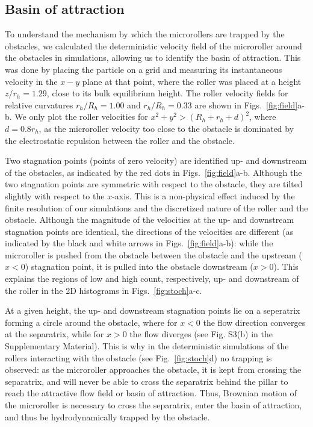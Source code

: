 \documentclass[12pt]{article}
\begin{document}
  



\subsection*{Basin of attraction }

To understand the mechanism by which the microrollers are trapped by the obstacles, we calculated the deterministic velocity field of the microroller around the obstacles in simulations, allowing us to identify the basin of attraction. This was done by placing the particle on a grid and measuring its instantaneous velocity in the $x-y$ plane at that point, where the roller was placed at a height  $z/r_h = 1.29$, close to its bulk equilibrium height.
The roller velocity fields for relative curvatures $r_h/R_h=1.00$ and $r_h/R_h=0.33$ are shown in Figs.~\ref{fig:field}a-b. 
We only plot the roller velocities for $x^2+y^2>(R_h+r_h+d)^2$, where $d=0.8r_h$\cite{electro}, as the microroller velocity too close to the obstacle is dominated by the electrostatic repulsion between the roller and the obstacle.


Two stagnation points (points of zero velocity) are identified up- and downstream of the obstacles, as indicated by the red dots in Figs.~\ref{fig:field}a-b. Although the two stagnation points are symmetric with respect to the obstacle, they are tilted slightly with respect to the $x$-axis. This is a non-physical effect induced by the finite resolution of our simulations and the discretized nature of the roller and the obstacle. Although the magnitude of the velocities at the up- and downstream stagnation points are identical, the directions of the velocities are different (as indicated by the black and white arrows in Figs.~\ref{fig:field}a-b): 
while the microroller is pushed from the obstacle between the obstacle and the upstream ($x<0$) stagnation point, it is pulled into the obstacle downstream ($x>0$).
This explains the regions of low and high count, respectively, up- and downstream of the roller in the 2D histograms in Figs.~\ref{fig:stoch}a-c.

At a given height, the up- and downstream stagnation points lie on a seperatrix forming a circle around the obstacle, where for $x<0$ the flow direction converges at the separatrix, while for $x>0$ the flow diverges (see Fig. S3(b) in the Supplementary Material). This is why in the deterministic simulations of the rollers interacting with the obstacle (see Fig.~\ref{fig:stoch}d) no trapping is observed: as the microroller approaches the obstacle, it is kept from crossing the separatrix, and will never be able to cross the separatrix behind the pillar to reach the attractive flow field or basin of attraction. Thus, Brownian motion of the microroller is necessary to cross the separatrix, enter the basin of attraction, and thus be hydrodynamically trapped by the obstacle. 
\end{document}
